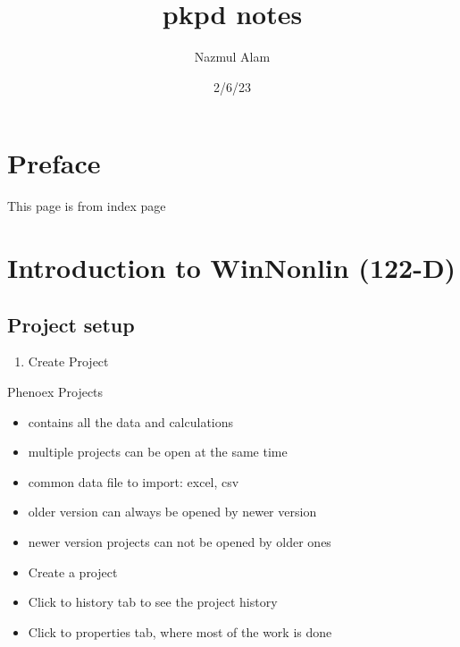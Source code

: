 \documentclass[
  letterpaper,
  DIV=11,
  numbers=noendperiod]{scrreprt}
\title{pkpd notes}
\author{Nazmul Alam}
\date{2/6/23}
\providecommand{\tightlist}{%
  \setlength{\itemsep}{0pt}\setlength{\parskip}{0pt}}\usepackage{longtable,booktabs,array}
\renewcommand*\contentsname{Table of contents}
\newcommand\contentsname{Table of contents}
\begin{document}
\maketitle
\ifdefined\Shaded\renewenvironment{Shaded}{\begin{tcolorbox}[boxrule=0pt, breakable, interior hidden, borderline west={3pt}{0pt}{shadecolor}, sharp corners, enhanced, frame hidden]}{\end{tcolorbox}}\fi

\renewcommand*\contentsname{Table of contents}
{
\hypersetup{linkcolor=}
\setcounter{tocdepth}{2}
\tableofcontents
}

\hypertarget{preface}{%
\chapter*{Preface}\label{preface}}


This page is from index page


\hypertarget{introduction-to-winnonlin-122-d}{%
\chapter{Introduction to WinNonlin
(122-D)}\label{introduction-to-winnonlin-122-d}}

\hypertarget{project-setup}{%
\section{Project setup}\label{project-setup}}

\begin{enumerate}
\def\labelenumi{\arabic{enumi}.}
\tightlist
\item
  Create Project
\end{enumerate}

Phenoex Projects

\begin{itemize}
\item
  contains all the data and calculations
\item
  multiple projects can be open at the same time
\item
  common data file to import: excel, csv
\item
  older version can always be opened by newer version
\item
  newer version projects can not be opened by older ones
\item
  Create a project
\item
  Click to history tab to see the project history
\item
  Click to properties tab, where most of the work is done
\end{itemize}
\end{document}
